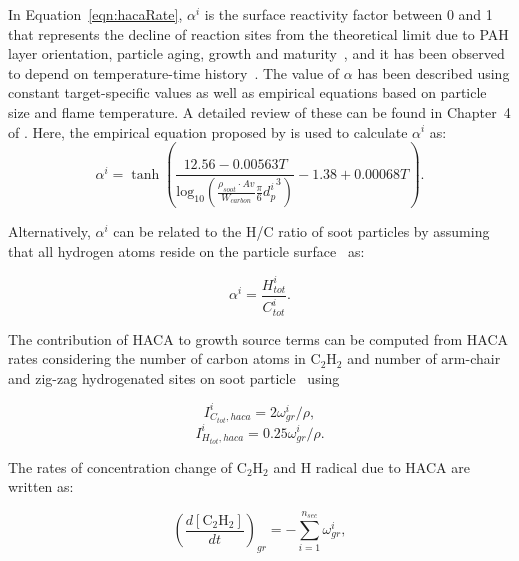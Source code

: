 In Equation~\eqref{eqn:hacaRate}, $\alpha^i$ is the surface reactivity factor between 0 and 1 that represents the decline of reaction sites from the theoretical limit due to PAH layer orientation, particle aging, growth and maturity~\citep{haynes1982surface, harris1985chemical}, and it has been observed to depend on temperature-time history~\cite{homann1985formation, dasch1985decay}. The value of $\alpha$ has been described using constant target-specific values as well as empirical equations based on particle size and flame temperature. A detailed review of these can be found in Chapter~4 of \citep{veshkini2015understanding}.  Here, the empirical equation proposed by \citet{appel2000kinetic} is used to calculate $\alpha^i$ as:
\begin{equation}
	\alpha^i = \tanh 
	\left(
	\frac{12.56 - 0.00563 T}
	{\mbox{log}_{10}
		\left( \frac{\rho_{soot}\cdot Av}{W_{carbon}} \frac{\pi}{6}{d^i_p}^3 \right) } -1.38+0.00068T
	\right)
	\label{eqn:alpha}.
\end{equation}

Alternatively, $\alpha^i$ can be related to the H/C ratio of soot particles by assuming that all hydrogen atoms reside on the particle surface~\citep{blanquart2009joint} as:

\begin{equation}
	\alpha^i = \frac{H^i_{tot}}{C^i_{tot}}
	\label{eqn:alpha_htoc}.
\end{equation}

The contribution of HACA to growth source terms can be computed from HACA rates considering the number of carbon atoms in $\mathrm{C_2H_2}$ and number of arm-chair and zig-zag hydrogenated sites on soot particle~\cite{blanquart2009analyzing} using

\begin{equation}
	I^i_{C_{tot},haca} = 2\omega^i_{gr}/\rho
	\label{eqn:IiCtotgr},
\end{equation}
\begin{equation}
	I^i_{H_{tot},haca} = 0.25\omega^i_{gr}/\rho
	\label{eqn:IiHtotgr}.
\end{equation}

The rates of concentration change of $\mathrm{C_2H_2}$ and H radical due to HACA are written as:

\begin{equation}
	\left(\frac{d\left[{\mathrm{C_2H_2}}\right]}{dt}\right)_{gr} = -\sum_{i=1}^{n_{sec}}\omega^i_{gr},
	\label{eqn:C2H2rate_gr}
\end{equation}

